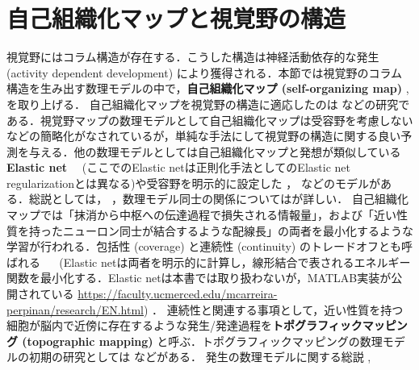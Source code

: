 \section{自己組織化マップと視覚野の構造}
視覚野にはコラム構造が存在する．こうした構造は神経活動依存的な発生  (activity dependent development) により獲得される．本節では視覚野のコラム構造を生み出す数理モデルの中で，\textbf{自己組織化マップ (self-organizing map)} \citep{Kohonen1982-mn}, \citep{Kohonen2013-yt}を取り上げる．
自己組織化マップを視覚野の構造に適応したのは\citep{Obermayer1990-gq} \citep{N_V_Swindale1998-ri}などの研究である．視覚野マップの数理モデルとして自己組織化マップは受容野を考慮しないなどの簡略化がなされているが，単純な手法にして視覚野の構造に関する良い予測を与える．他の数理モデルとしては自己組織化マップと発想が類似している \textbf{Elastic net}  \citep{Durbin1987-bp} \citep{Durbin1990-xx} \citep{Carreira-Perpinan2005-gy}　(ここでのElastic netは正則化手法としてのElastic net regularizationとは異なる)や受容野を明示的に設定した \citep{Tanaka2004-vz}， \citep{Ringach2007-oe}などのモデルがある．総説としては\citep{Das2005-mq}，\citep{Goodhill2007-va} ，数理モデル同士の関係については\citep{2002-nm}が詳しい．
自己組織化マップでは「抹消から中枢への伝達過程で損失される情報量」，および「近い性質を持ったニューロン同士が結合するような配線長」の両者を最小化するような学習が行われる．包括性 (coverage) と連続性 (continuity) のトレードオフとも呼ばれる \citep{Carreira-Perpinan2005-gy}　 (Elastic netは両者を明示的に計算し，線形結合で表されるエネルギー関数を最小化する．Elastic netは本書では取り扱わないが，MATLAB実装が公開されている
\url{https://faculty.ucmerced.edu/mcarreira-perpinan/research/EN.html}) ． 連続性と関連する事項として，近い性質を持つ細胞が脳内で近傍に存在するような発生/発達過程を\textbf{トポグラフィックマッピング (topographic mapping)} と呼ぶ．トポグラフィックマッピングの数理モデルの初期の研究としては\citep{Von_der_Malsburg1973-bz} \citep{Willshaw1976-zo} \citep{Takeuchi1979-mi}などがある．
発生の数理モデルに関する総説 \citep{Van_Ooyen2011-fz}, \citep{Goodhill2018-ho}
